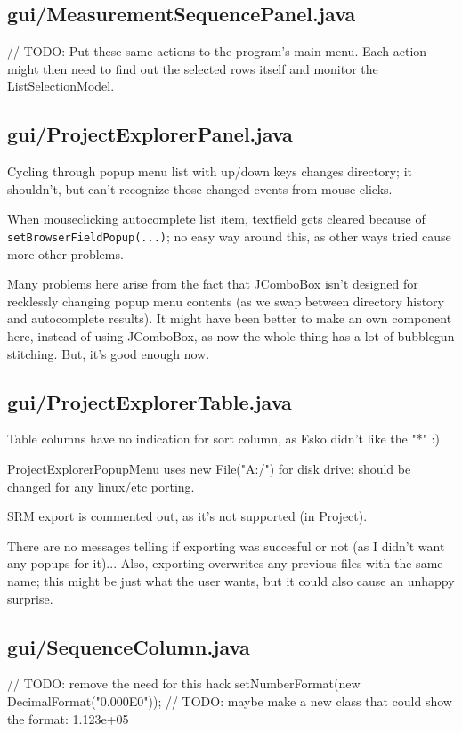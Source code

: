 \subsection{gui/MeasurementSequencePanel.java}
        // TODO: Put these same actions to the program's main menu. Each action might then need to find out the selected rows itself and monitor the ListSelectionModel.


\subsection{gui/ProjectExplorerPanel.java}

Cycling through popup menu list with up/down keys changes directory; it shouldn't, but can't recognize those changed-events from mouse clicks.

When mouseclicking autocomplete list item, textfield gets cleared because of \texttt{setBrowserFieldPopup(...)}; no easy way around this, as other ways tried cause more other problems.

Many problems here arise from the fact that JComboBox isn't designed for recklessly changing popup menu contents (as we swap between directory history and autocomplete results). It might have been better to make an own component here, instead of using JComboBox, as now the whole thing has a lot of bubblegun stitching. But, it's good enough now.


\subsection{gui/ProjectExplorerTable.java}

Table columns have no indication for sort column, as Esko didn't like the "*" :)
	    
ProjectExplorerPopupMenu uses new File("A:/") for disk drive; should be changed for any linux/etc porting.

SRM export is commented out, as it's not supported (in Project).

There are no messages telling if exporting was succesful or not (as I didn't want any popups for it)... Also, exporting overwrites any previous files with the same name; this might be just what the user wants, but it could also cause an unhappy surprise.


\subsection{gui/SequenceColumn.java}
        // TODO: remove the need for this hack
            setNumberFormat(new DecimalFormat("0.000E0"));  // TODO: maybe make a new class that could show the format: 1.123e+05

